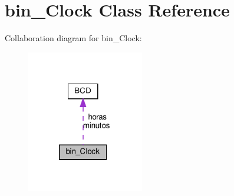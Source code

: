 \hypertarget{classbin__Clock}{}\section{bin\+\_\+\+Clock Class Reference}
\label{classbin__Clock}


Collaboration diagram for bin\+\_\+\+Clock\+:
\nopagebreak
\begin{figure}[H]
\begin{center}
\leavevmode
\includegraphics[width=145pt]{classbin__Clock__coll__graph}
\end{center}
\end{figure}
